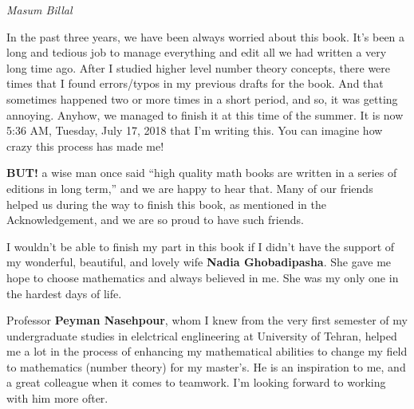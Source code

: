 \documentclass[12pt]{book}
\begin{document}
\begin{flushright}
	\sl Masum Billal
\end{flushright}

\newpage

In the past three years, we have been always worried about this book. It's been a long and tedious job to manage everything and edit all we had written a very long time ago. After I studied higher level number theory concepts, there were times that I found errors/typos in my previous drafts for the book. And that sometimes happened two or more times in a short period, and so, it was getting annoying. Anyhow, we managed to finish it at this time of the summer. It is now 5:36 AM, Tuesday, July 17, 2018 that I'm writing this. You can imagine how crazy this process has made me!

\vspace{0.3cm}

\textbf{BUT!} a wise man once said ``high quality math books are written in a series of editions in long term,'' and we are happy to hear that. Many of our friends helped us during the way to finish this book, as mentioned in the Acknowledgement, and we are so proud to have such friends.

\vspace{0.3cm}

I wouldn't be able to finish my part in this book if I didn't have the support of my wonderful, beautiful, and lovely wife \textbf{Nadia Ghobadipasha}. She gave me hope to choose mathematics and always believed in me. She was my only one in the hardest days of life.

\vspace{0.3cm}

Professor \textbf{Peyman Nasehpour}, whom I knew from the very first semester of my undergraduate studies in elelctrical englineering at University of Tehran, helped me a lot in the process of enhancing my mathematical abilities to change my field to mathematics (number theory) for my master's.  He is an inspiration to me, and a great colleague when it comes to teamwork. I'm looking forward to working with him more ofter.

\vspace{0.3cm}
\end{document}
